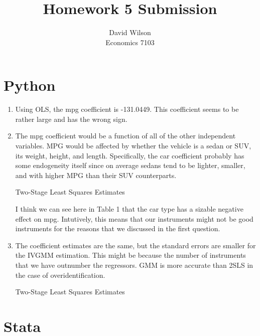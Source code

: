 \documentclass{article}
\title{Homework 5 Submission}
\author{David Wilson \\ Economics 7103}
\begin{document}
  
\maketitle

\section*{Python}

\begin{enumerate}
\item Using OLS, the mpg coefficient is -131.0449. This coefficient seems to be rather large and has the wrong sign.

\item The mpg coefficient would be a function of all of the other independent variables. MPG would be affected by whether the vehicle is a sedan or SUV, its weight, height, and length. Specifically, the car coefficient probably has some endogeneity itself since on average sedans tend to be lighter, smaller, and with higher MPG than their SUV counterparts.

\begin{table}[H]
    \centering
    \caption{Two-Stage Least Squares Estimates}
    \begin{threepart}
        
    \end{threepart}
\end{table}

I think we can see here in Table 1 that the car type has a sizable negative effect on mpg. Intutively, this means that our instruments might not be good instruments for the reasons that we discussed in the first question.

\setcounter{enumi}{3}
\item The coefficient estimates are the same, but the standard errors are smaller for the IVGMM estimation. This might be because the number of instruments that we have outnumber the regressors. GMM is more accurate than 2SLS in the case of overidentification.

\begin{table}[H]
    \centering
    \caption{Two-Stage Least Squares Estimates}
    \begin{threepart}
        
    \end{threepart}
\end{table}


\end{enumerate} 
   
\section*{Stata}
    
\end{document}
